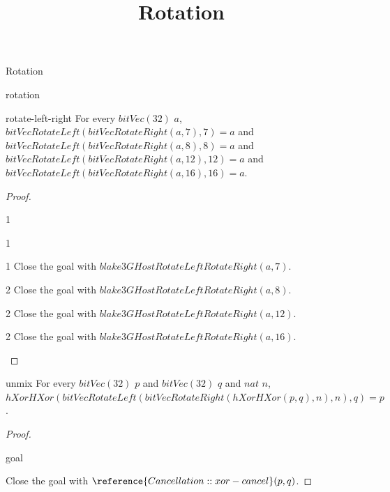 \begin{lexlean}{Rotation}
\title{Rotation}

\begin{section}{rotation}
  \begin{theorem}{rotate-left-right}
  For every \(bitVec(32)\) \(a\), \(bitVecRotateLeft(bitVecRotateRight(a, 7), 7) = a\) and \(bitVecRotateLeft(bitVecRotateRight(a, 8), 8) = a\) and \(bitVecRotateLeft(bitVecRotateRight(a, 12), 12) = a\) and \(bitVecRotateLeft(bitVecRotateRight(a, 16), 16) = a\).
  \begin{proof}
  \begin{constructor}
  \begin{branch}{1}
  \begin{constructor}
  \begin{branch}{1}
  \begin{constructor}
  \begin{branch}{1}
  Close the goal with \(blake3GHostRotateLeftRotateRight(a, 7)\).
  \end{branch}
  \begin{branch}{2}
  Close the goal with \(blake3GHostRotateLeftRotateRight(a, 8)\).
  \end{branch}
  \end{constructor}
  \end{branch}
  \begin{branch}{2}
  Close the goal with \(blake3GHostRotateLeftRotateRight(a, 12)\).
  \end{branch}
  \end{constructor}
  \end{branch}
  \begin{branch}{2}
  Close the goal with \(blake3GHostRotateLeftRotateRight(a, 16)\).
  \end{branch}
  \end{constructor}
  \end{proof}
  \end{theorem}

  \begin{lemma}{unmix}
  For every \(bitVec(32)\) \(p\) and \(bitVec(32)\) \(q\) and \(nat\) \(n\), \(hXorHXor(bitVecRotateLeft(bitVecRotateRight(hXorHXor(p, q), n), n), q) = p\).
  \begin{proof}
  \begin{rewrite}{goal}
  \end{rewrite}
  Close the goal with \(\reference{Cancellation::xor-cancel}(p, q)\).
  \end{proof}
  \end{lemma}
\end{section}
\end{lexlean}
